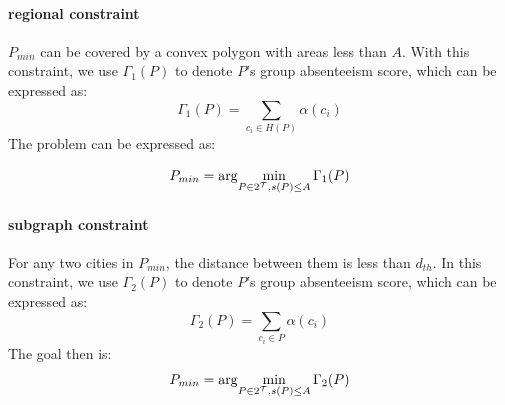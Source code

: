 \paragraph{regional constraint} $P_{min}$ can be covered by
a convex polygon with areas less than $A$. With this constraint, we use $\Gamma_1(P)$ to denote $P$'s group absenteeism score, which can be expressed as:
 \begin{equation}
\Gamma_1(P)=\sum_{c_i\in H(P)} {\alpha(c_i)}
\end{equation}
The problem can be expressed as:

 \begin{equation}
 P_{min}=\arg\!\min\limits_{P\in 2^\mathcal{T}, s(P)\leq A}\Gamma_1(P)
\end{equation}

 \paragraph{subgraph constraint}For any two cities in $P_{min}$, the distance between them is less than $d_{th}$. In this constraint, we use $\Gamma_2(P)$ to denote $P$'s group absenteeism score, which can be expressed as:
 \begin{equation}
\Gamma_2(P)=\sum_{c_i\in P} {\alpha(c_i)}
\end{equation}
The goal then is:
 \begin{equation}
 P_{min}=\arg\!\min\limits_{P\in 2^\mathcal{T}, s(P)\leq A}\Gamma_2(P)
\end{equation}

